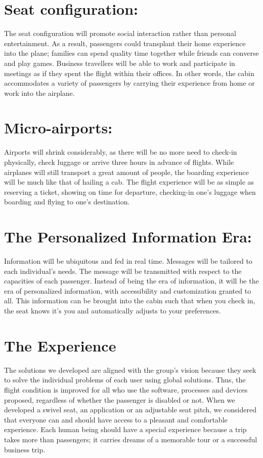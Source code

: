 \section{Seat configuration:}
The seat configuration will promote social interaction rather than personal entertainment. As a result, passengers could transplant their home experience into the plane; families can spend quality time together while friends can converse and play games. Business travellers will be able to work and participate in meetings as if they spent the flight within their offices. In other words, the cabin accommodates a variety of passengers by carrying their experience from home or work into the airplane.

\section{Micro-airports:}
Airports will shrink considerably, as there will be no more need to check-in physically, check luggage or arrive three hours in advance of flights. While airplanes will still transport a great amount of people, the boarding experience will be much like that of hailing a cab. The flight experience will be as simple as reserving a ticket, showing on time for departure, checking-in one’s luggage when boarding and flying to one’s destination.

\section{The Personalized Information Era:}
Information will be ubiquitous and fed in real time. Messages will be tailored to each individual’s needs. The message will be transmitted with respect to the capacities of each passenger. Instead of being the era of information, it will be the era of personalized information, with accessibility and customization granted to all. This information can be brought into the cabin such that when you check in, the seat knows it’s you and automatically adjusts to your preferences.

\section{The Experience}
The solutions we developed are aligned with the group's vision because they seek to solve the individual problems of each user using global solutions. Thus, the flight condition is improved for all who use the software, processes and devices proposed, regardless of whether the passenger is disabled or not. When we developed a swivel seat, an application or an adjustable seat pitch, we considered that everyone can and should have access to a pleasant and comfortable experience. Each human being should have a special experience because a trip takes more than passengers; it carries dreams of a memorable tour or a successful business trip.
